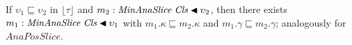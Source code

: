 \begin{theorem}\label{thm:ana-mono}
If $\upsilon_1 \sqsubseteq \upsilon_2$ in $\lfloor\tau\rfloor$ and $m_2 : \mathit{MinAnaSlice}\;\mathit{Cls} \mathbin{\blacktriangleleft} \upsilon_2$, then there exists $m_1 : \mathit{MinAnaSlice}\;\mathit{Cls} \mathbin{\blacktriangleleft} \upsilon_1$ with $m_1.\kappa \sqsubseteq m_2.\kappa$ and $m_1.\gamma \sqsubseteq m_2.\gamma$; analogously for $\mathit{AnaPosSlice}$.
\end{theorem}

\clearpage

